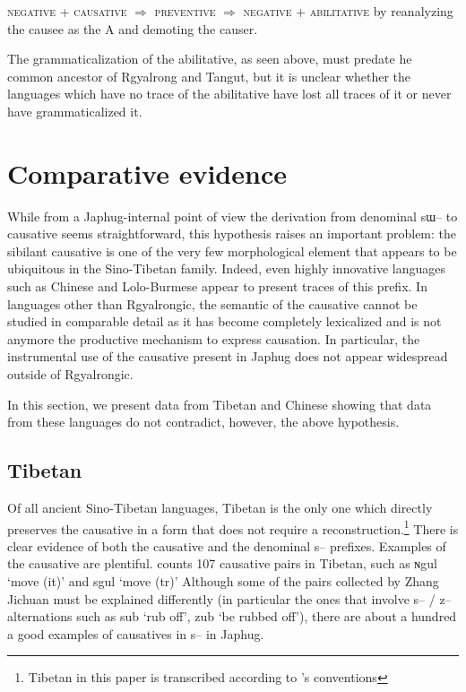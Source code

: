 \documentclass[oldfontcommands,oneside,a4paper,11pt]{article}
\newcommand{\ipa}[1]{{\phon \mbox{#1}}} %
\begin{document}
\begin{exe}
\ex \label{ex:pathway}
\glt \textsc{negative}   + \textsc{causative} $\Rightarrow$ \textsc{preventive} $\Rightarrow$ \textsc{negative} +  \textsc{abilitative} 
\glt by reanalyzing the causee as the A and demoting the causer.
\end{exe}


The grammaticalization of the abilitative, as seen above, must predate he common ancestor of Rgyalrong and Tangut, but it is unclear whether the languages which have no trace of the abilitative have lost all traces of it or never have grammaticalized it.

\section{Comparative evidence}

 While from a Japhug-internal point of view the derivation from denominal \ipa{sɯ--} to causative seems straightforward, this hypothesis raises an important problem:  the sibilant causative is one of the very few morphological element that appears to be ubiquitous in the Sino-Tibetan family. Indeed, even highly innovative languages such as Chinese and Lolo-Burmese appear to present  traces of this prefix. In languages other than Rgyalrongic, the semantic of the causative cannot be studied in comparable detail as it has become completely lexicalized and is not anymore the productive mechanism to express causation. In particular, the instrumental use of the causative present in Japhug does not appear widespread outside of Rgyalrongic.
 
 In this section, we present data from Tibetan and Chinese showing that data from these languages do not contradict, however, the above hypothesis.

 
\subsection{Tibetan}

Of all ancient Sino-Tibetan languages, Tibetan is the only one which directly preserves the causative in a form that does not require a reconstruction.\footnote{Tibetan in this paper is transcribed according to \citet{jacques12transcription}'s conventions} There is clear evidence of both the causative and the denominal \ipa{s--} prefixes.  Examples of the causative are plentiful. \citet[210-8]{zhang09cizu} counts 107 causative pairs in Tibetan, such as \ipa{ɴgul} `move (it)' and \ipa{sgul} `move (tr)' Although some of the pairs collected by Zhang Jichuan must be explained differently (in particular the ones that involve \ipa{s--} / \ipa{z--} alternations such as \ipa{sub} `rub off', \ipa{zub} `be rubbed off'), there are about a hundred a good examples of causatives in \ipa{s--} in Japhug.
\end{document}
